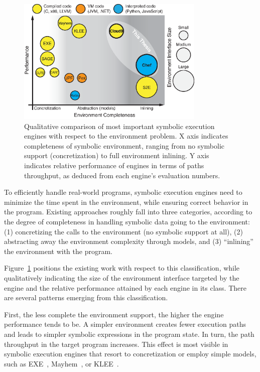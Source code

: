 \begin{figure}
  \centering
  \includegraphics[width=0.8\textwidth]{relatedwork/figures/relwork-positioning}
  \caption[Qualitative comparison of most important symbolic execution engines with respect to the environment problem.]{Qualitative comparison of most important symbolic execution engines with respect to the environment problem. X axis indicates completeness of symbolic environment, ranging from no symbolic support (concretization) to full environment inlining.  Y axis indicates relative performance of engines in terms of paths throughput, as deduced from each engine's evaluation numbers.}
  \label{fig:relwork:positioning}
\end{figure}

To efficiently handle real-world programs, symbolic execution engines need to minimize the time spent in the environment, while ensuring correct behavior in the program.
%
Existing approaches roughly fall into three categories, according to the degree of completeness in handling symbolic data going to the environment: (1) concretizing the calls to the environment (no symbolic support at all), (2) abstracting away the environment complexity through models, and (3) ``inlining'' the environment with the program.

Figure~\ref{fig:relwork:positioning} positions the existing work with respect to this classification, while qualitatively indicating the size of the environment interface targeted by the engine and the relative performance attained by each engine in its class.
%
There are several patterns emerging from this classification.

First, the less complete the environment support, the higher the engine performance tends to be.
%
A simpler environment creates fewer execution paths and leads to simpler symbolic expressions in the program state.  In turn, the path throughput in the target program increases.
%
This effect is most visible in symbolic execution engines that resort to concretization or employ simple models, such as EXE~\cite{exe}, Mayhem~\cite{mayhem}, or KLEE~\cite{klee}.

